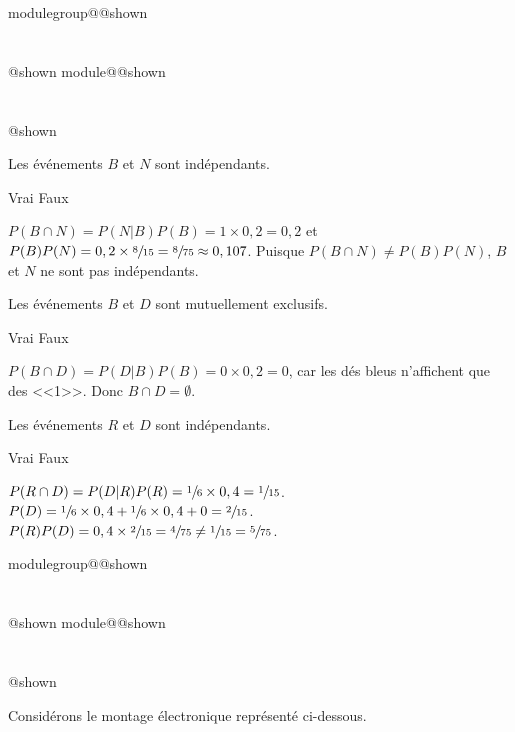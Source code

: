 \documentclass{Evaluation}
\makeatletter
\newcommand{\currentmodulekey}{}
\newcommand{\currentmoduletitle}{}
\newcommand{\currentgroupkey}{}
\newcommand{\currentgrouptitle}{}
\newcommand{\showmoduleifneeded}{%
  \ifx\currentgroupkey\empty\else
    \expandafter\ifx\csname modulegroup@\currentgroupkey @shown\endcsname\relax
      \section*{\currentgrouptitle}%
      \expandafter\gdef\csname modulegroup@\currentgroupkey @shown\endcsname{1}%
    \fi
  \fi
  \expandafter\ifx\csname module@\currentmodulekey @shown\endcsname\relax
    \section*{\currentmoduletitle}%
    \expandafter\gdef\csname module@\currentmodulekey @shown\endcsname{1}%
  \fi
}
\newenvironment{A22}{\showmoduleifneeded}{}
\newenvironment{H26}{\showmoduleifneeded}{}
\makeatother
\begin{document}
\begin{questions}
\begin{H26}
\begin{parts}
\begin{subparts}
    \subpart Les événements $B$ et $N$ sont indépendants.

\begin{oneparcheckboxes}
    \choice Vrai
    \correctchoice Faux
\end{oneparcheckboxes}

\begin{solution}
    $P(B \cap N) = P(N|B)P(B) = 1 \times 0,2 = 0,2$ et $P(B)P(N) = 0,2 \times \sfrac{8}{15} = \sfrac{8}{75} \approx 0,107$. Puisque $P(B \cap N) \neq P(B)P(N)$, $B$ et $N$ ne sont pas indépendants.
\end{solution}

    \subpart Les événements $B$ et $D$ sont mutuellement exclusifs.

\begin{oneparcheckboxes}
    \correctchoice Vrai
    \choice Faux
\end{oneparcheckboxes}

\begin{solution}
    $P(B \cap D) = P(D|B)P(B) = 0 \times 0,2 = 0$, car les dés bleus n'affichent que des <<1>>. Donc $B \cap D = \emptyset$.
\end{solution}

    \subpart Les événements $R$ et $D$ sont indépendants.

\begin{oneparcheckboxes}
    \choice Vrai
    \correctchoice Faux
\end{oneparcheckboxes}

\begin{solution}
    $P(R \cap D) = P(D|R)P(R) = \sfrac{1}{6} \times 0,4 = \sfrac{1}{15}$. $P(D) = \sfrac{1}{6}\times 0,4 + \sfrac{1}{6}\times 0,4 + 0 = \sfrac{2}{15}$. $P(R)P(D) = 0,4 \times \sfrac{2}{15} = \sfrac{4}{75} \neq \sfrac{1}{15} = \sfrac{5}{75}$.
\end{solution}
\end{subparts}
\end{parts}
\end{H26}

\begin{A22}
\question {} %
Considérons le montage électronique représenté ci-dessous.

\begin{figure}[h!]
    \label{fig:montage}
    \begin{center}	 \end{center}
\vspace{-0.8cm}\end{figure}


\end{A22}
\end{questions}
\end{document}
